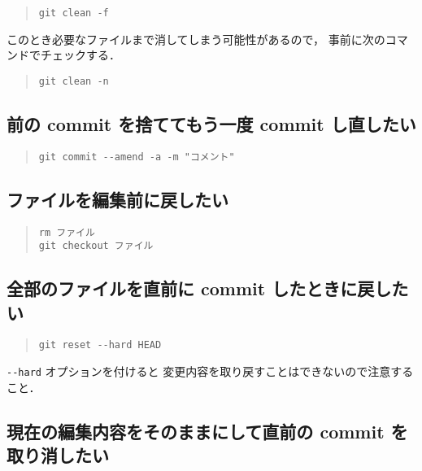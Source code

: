 \documentclass[a4j,10pt]{jarticle}
\begin{document}
\begin{quote}
\begin{verbatim}
git clean -f
\end{verbatim}
\end{quote}

このとき必要なファイルまで消してしまう可能性があるので，
事前に次のコマンドでチェックする．

\begin{quote}
\begin{verbatim}
git clean -n
\end{verbatim}
\end{quote}

\subsection{前の commit を捨ててもう一度 commit し直したい}

\begin{quote}
\begin{verbatim}
git commit --amend -a -m "コメント"
\end{verbatim}
\end{quote}

\subsection{ファイルを編集前に戻したい}

\begin{quote}
\begin{verbatim}
rm ファイル
git checkout ファイル
\end{verbatim}
\end{quote}

\subsection{全部のファイルを直前に commit したときに戻したい}

\begin{quote}
\begin{verbatim}
git reset --hard HEAD
\end{verbatim}
\end{quote}

\verb|--hard| オプションを付けると
変更内容を取り戻すことはできないので注意すること．

\subsection{現在の編集内容をそのままにして直前の commit を取り消したい}
\end{document}
